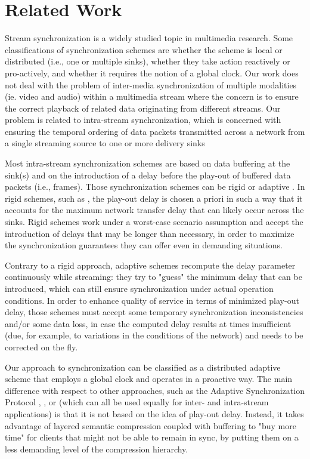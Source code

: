\documentclass{sig-alternate}
\begin{document}
\section{Related Work} \label{related}
Stream synchronization is a widely studied topic in multimedia
research.  Some classifications of synchronization schemes are whether
the scheme is local or distributed (i.e., one or multiple sinks),
whether they take action reactively or pro-actively, and whether it
requires the notion of a global clock.  Our work does not deal with
the problem of inter-media synchronization of multiple modalities
(ie. video and audio) within a multimedia stream where the concern is
to ensure the correct playback of related data originating from
different streams.  Our problem is related to intra-stream
synchronization, which is concerned with ensuring the temporal
ordering of data packets transmitted across a network from a single
streaming source to one or more delivery sinks

Most intra-stream synchronization schemes are based on data buffering
at the sink(s) and on the introduction of a delay before the play-out
of buffered data packets (i.e., frames).  Those synchronization
schemes can be rigid or adaptive \cite{Clark92}.  In rigid schemes,
such as \cite{Ferrari}, the play-out delay is chosen a priori in such
a way that it accounts for the maximum network transfer delay that can
likely occur across the sinks.  Rigid schemes work under a worst-case
scenario assumption and accept the introduction of delays that may be
longer than necessary, in order to maximize the synchronization
guarantees they can offer even in demanding situations.  

Contrary to a rigid approach, adaptive schemes \cite{ASP,Lancaster,FSP} 
recompute the delay parameter continuously while streaming: they
try to "guess" the minimum delay that can be introduced, which can
still ensure synchronization under actual operation conditions.  In
order to enhance quality of service in terms of minimized play-out
delay, those schemes must accept some temporary synchronization
inconsistencies and/or some data loss, in case the computed delay
results at times insufficient (due, for example, to variations in the
conditions of the network) and needs to be corrected on the fly.

Our approach to synchronization can be classified as a distributed
adaptive scheme that employs a global clock and operates in a
proactive way.  The main difference with respect to other approaches,
such as the Adaptive Synchronization Protocol \cite{ASP},
\cite{GONZALEZ}, or \cite{LIU} (which can all be used equally for
inter- and intra-stream applications) is that it is not based on the
idea of play-out delay.  Instead, it takes advantage of layered
semantic compression coupled with buffering to "buy more time" for
clients that might not be able to remain in sync, by putting them on a
less demanding level of the compression hierarchy.
\end{document}
